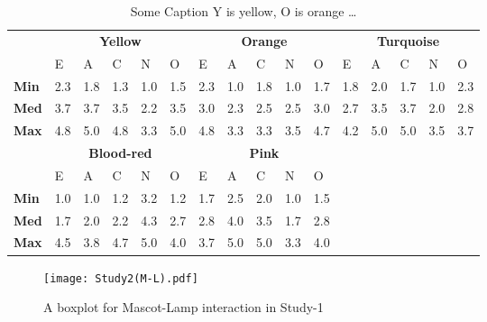 \begin{table}[H]
    \renewcommand{\arraystretch}{1.2}
    \caption{Some Caption Y is yellow, O is orange \ldots}
    \label{table:medianML2}
    \begin{center}
        \begin{tabular}{p{}|
        p{}|p{}|p{}|p{}|p{}||
        p{}|p{}|p{}|p{}|p{}||
        p{}|p{}|p{}|p{}|p{}|}
            \cline{2-16}
            & \multicolumn{5}{c||}{\textbf{Yellow}} & \multicolumn{5}{c||}{\textbf{Orange}}
            & \multicolumn{5}{c|}{\textbf{Turquoise}} \\
            \cline{2-16}
                            & E & A & C & N & O 			    & E & A & C & N & O   	 	& E & A & C & N & O      \\
            \cline{2-16}
            \textbf{Min}  	& 2.3 & 1.8 & 1.3 & 1.0 & 1.5 		& 2.3 & 1.0 & 1.8 & 1.0 & 1.7  	& 1.8 & 2.0 & 1.7 & 1.0 & 2.3  \\
            \textbf{Med} 	& 3.7 & 3.7 & 3.5 & 2.2 & 3.5 		& 3.0 & 2.3 & 2.5 & 2.5 & 3.0  	& 2.7 & 3.5 & 3.7 & 2.0 & 2.8  \\
            \textbf{Max}	& 4.8 & 5.0 & 4.8 & 3.3 & 5.0 		& 4.8 & 3.3 & 3.3 & 3.5 & 4.7  	& 4.2 & 5.0 & 5.0 & 3.5 & 3.7 \\
            \cline{2-16}
            \cline{2-11}
            &  \multicolumn{5}{|c||}{\textbf{Blood-red}} & \multicolumn{5}{|c||}{\textbf{Pink}} \\
            \cline{2-11}
            & E & A & C & N & O 			& E & A & C & N & O     		\\
            \cline{2-11}
            \textbf{Min} 	& 1.0 & 1.0 & 1.2 & 3.2 & 1.2 		& 1.7 & 2.5 & 2.0 & 1.0 & 1.5 	\\
            \textbf{Med}    & 1.7 & 2.0 & 2.2 & 4.3 & 2.7 	    & 2.8 & 4.0 & 3.5 & 1.7 & 2.8 	\\
            \textbf{Max}  	& 4.5 & 3.8 & 4.7 & 5.0 & 4.0 		& 3.7 & 5.0 & 5.0 & 3.3 & 4.0  	\\
            \cline{2-11}
        \end{tabular}
    \end{center}
\end{table}

\begin{figure}[H]
    \centering
    \texttt{[image: Study2(M-L).pdf]}
    \caption{A boxplot for Mascot-Lamp interaction in Study-1}
    \label{fig:ML2}
\end{figure}

